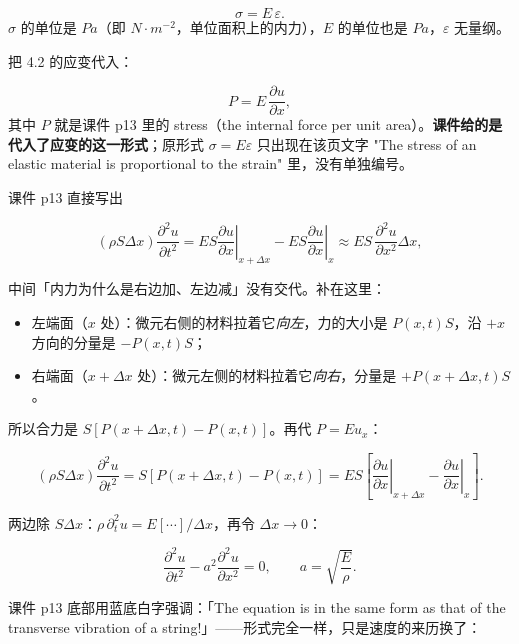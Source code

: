 \[
\sigma=E\,\varepsilon .
\]
$\sigma$ 的单位是 $\unit{Pa}$（即 $\unit{N\cdot m^{-2}}$，单位面积上的内力），$E$ 的单位也是 $\unit{Pa}$，$\varepsilon$ 无量纲。

把 4.2 的应变代入：

\[
P=E\,\frac{\partial u}{\partial x},
\]
其中 $P$ 就是课件 p13 里的 stress（the internal force per unit area）。\textbf{课件给的是代入了应变的这一形式}；原形式 $\sigma=E\varepsilon$ 只出现在该页文字 "The stress of an elastic material is proportional to the strain" 里，没有单独编号。


课件 p13 直接写出

\[
(\rho S\Delta x)\frac{\partial^2u}{\partial t^2}
=ES\left.\frac{\partial u}{\partial x}\right|_{x+\Delta x}-ES\left.\frac{\partial u}{\partial x}\right|_{x}
\approx ES\,\frac{\partial^2u}{\partial x^2}\Delta x ,
\]

中间「内力为什么是右边加、左边减」没有交代。补在这里：

\begin{itemize}
\item 左端面（$x$ 处）：微元右侧的材料拉着它\emph{向左}，力的大小是 $P(x,t)S$，沿 $+x$ 方向的分量是 $-P(x,t)S$；
\item 右端面（$x+\Delta x$ 处）：微元左侧的材料拉着它\emph{向右}，分量是 $+P(x+\Delta x,t)S$。
\end{itemize}

所以合力是 $S\left[P(x+\Delta x,t)-P(x,t)\right]$。再代 $P=Eu_x$：

\[
(\rho S\Delta x)\frac{\partial^2u}{\partial t^2}
=S\left[P(x+\Delta x,t)-P(x,t)\right]
=ES\left[\left.\frac{\partial u}{\partial x}\right|_{x+\Delta x}-\left.\frac{\partial u}{\partial x}\right|_{x}\right].
\]



两边除 $S\Delta x$：$\rho\,\partial_t^2u=E\left[\cdots\right]/\Delta x$，再令 $\Delta x\to0$：

\[
\frac{\partial^2u}{\partial t^2}-a^2\frac{\partial^2u}{\partial x^2}=0,
\qquad a=\sqrt{\frac{E}{\rho}} .
\]

课件 p13 底部用蓝底白字强调：「The equation is in the same form as that of the transverse vibration of a string!」——形式完全一样，只是速度的来历换了：

